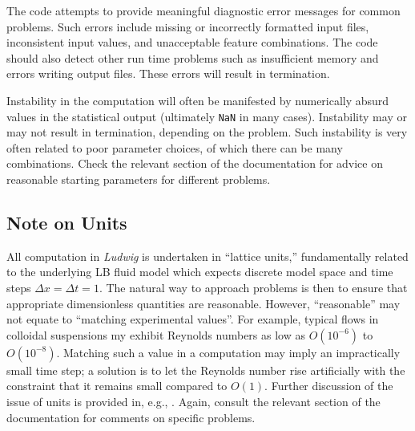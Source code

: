 The code attempts to provide meaningful diagnostic error messages
for common problems. Such errors include missing or incorrectly
formatted input files, inconsistent input values, and unacceptable
feature combinations. The code should also detect other run time
problems such as insufficient memory and errors writing output
files. These errors will result in termination.

Instability in the computation will often be manifested by numerically
absurd values in the statistical output (ultimately \texttt{NaN} in
many cases). Instability may or may not result in termination, depending
on the problem. Such instability is very often related to poor parameter
choices, of which there can be many combinations. Check the
relevant section of the documentation for advice on reasonable starting
parameters for different problems.


\subsection{Note on Units}

All computation in \textit{Ludwig} is undertaken in ``lattice
units,'' fundamentally related to the underlying LB fluid model
which expects discrete model space and time steps
$\Delta x = \Delta t = 1$. The natural way to approach problems
is then to ensure that appropriate dimensionless quantities are
reasonable. However, ``reasonable'' may not equate to ``matching
experimental values''. For example, typical flows in colloidal
suspensions my exhibit Reynolds numbers as low as $O(10^{-6})$
to $O(10^{-8})$.
Matching such a value in a computation may imply an impractically
small time step; a solution is to let the Reynolds number rise
artificially with the constraint that it remains small compared to $O(1)$.
Further discussion of the issue of units is provided in, e.g.,
\cite{cates_scaling}. Again, consult the relevant section of the documentation
for comments on specific problems.


\vfill
\pagebreak
